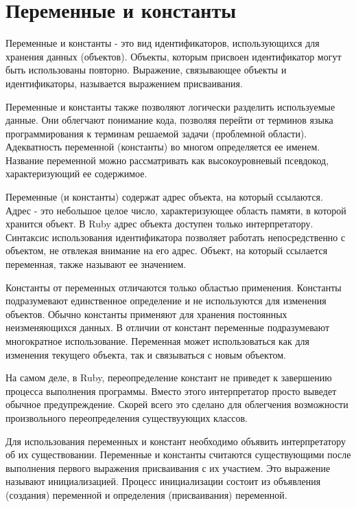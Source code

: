 \chapter{Переменные и константы}

Переменные и константы - это вид идентификаторов, использующихся для хранения данных (объектов). Объекты, которым присвоен идентификатор могут быть использованы повторно. Выражение, связывающее объекты и идентификаторы, называется выражением присваивания.

Переменные и константы также позволяют логически разделить используемые данные. Они облегчают понимание кода, позволяя перейти от терминов языка программирования к терминам решаемой задачи (проблемной области). Адекватность переменной (константы) во многом определяется ее именем. Название переменной можно рассматривать как высокоуровневый псевдокод, характеризующий ее содержимое.

Переменные (и константы) содержат адрес объекта, на который ссылаются. Адрес - это небольшое целое число, характеризующее область памяти, в которой хранится объект. В Ruby адрес объекта доступен только интерпретатору. Синтаксис использования идентификатора позволяет работать непосредственно с объектом, не отвлекая внимание на его адрес. Объект, на который ссылается переменная, также называют ее значением.

Константы от переменных отличаются только областью применения. Константы подразумевают единственное определение и не используются для изменения объектов. Обычно константы применяют для хранения постоянных неизменяющихся данных. В отличии от констант переменные подразумевают многократное использование. Переменная может использоваться как для изменения текущего объекта, так и связываться с новым объектом.

\begin{note}
  На самом деле, в Ruby, переопределение констант не приведет к завершению процесса выполнения программы. Вместо этого интерпретатор просто выведет обычное предупреждение. Скорей всего это сделано для облегчения возможности произвольного переопределения существуующих классов.
\end{note}

Для использования переменных и констант необходимо объявить интерпретатору об их существовании. Переменные и константы считаются существующими после выполнения первого выражения присваивания с их участием. Это выражение называют инициализацией. Процесс инициализации состоит из объявления (создания) переменной и определения (присваивания) переменной.

